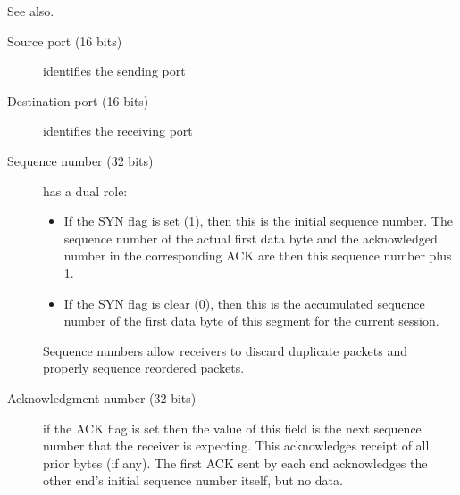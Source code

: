 See also.
\begin{description}
\item[Source port (16 bits)] identifies the sending port
\item[Destination port (16 bits)] identifies the receiving port
\item[Sequence number (32 bits)] has a dual role:
  \begin{itemize}
  \item If the SYN flag is set (1), then this is the initial sequence number. The sequence
    number of the actual first data byte and the acknowledged number in the corresponding
    ACK are then this sequence number plus 1.
  \item If the SYN flag is clear (0), then this is the accumulated sequence number of the
    first data byte of this segment for the current session.
  \end{itemize}
  Sequence numbers allow receivers to discard duplicate packets and properly sequence
  reordered packets.
\item[Acknowledgment number (32 bits)] if the ACK flag is set then the value of this field
  is the next sequence number that the receiver is expecting. This acknowledges receipt of
  all prior bytes (if any). The first ACK sent by each end acknowledges the other end's
  initial sequence number itself, but no data.


\end{description}
